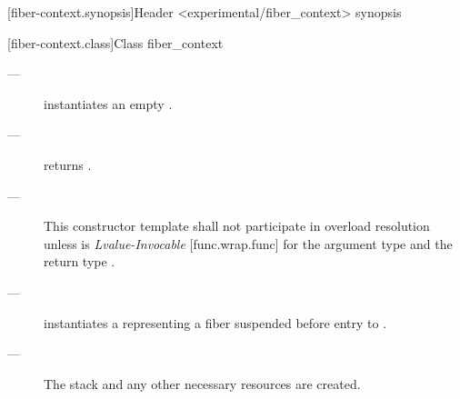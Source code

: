 
[fiber-context.synopsis]{Header <experimental/fiber\_context> synopsis}


[fiber-context.class]{Class fiber\_context}


\label{constructor}

\effects
\begin{description}
    \item[---] instantiates an empty \fiber.
\end{description}

\postcond
\begin{description}
    \item[---]  returns .
\end{description}


\constraints
\begin{description}
    \item[---] This constructor template shall not participate in overload
              resolution unless 
              is \emph{Lvalue-Invocable} [func.wrap.func] for the argument
              type  and the return type \fiber.
\end{description}

\effects
\begin{description}
    \item[---] instantiates a \fiber representing a fiber suspended before
              entry to .
    \item[---] The stack and any other necessary resources are created.
\end{description}

